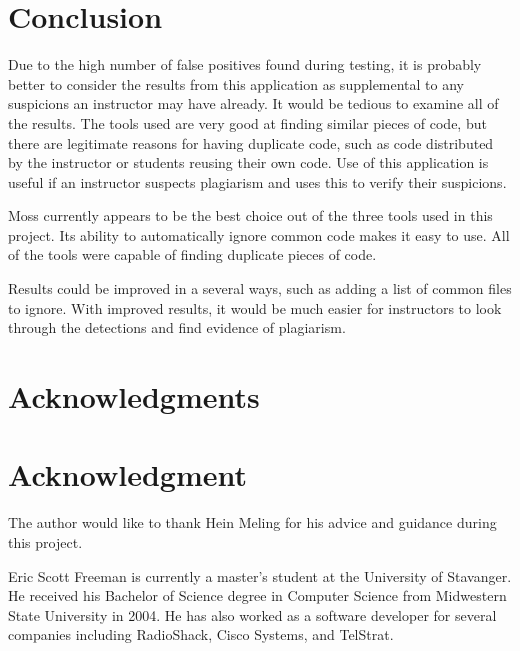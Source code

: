 \documentclass[10pt,journal,compsoc]{IEEEtran}
\begin{document}
	\section{Conclusion}
	Due to the high number of false positives found during testing, it is probably better to consider the results from this application as supplemental to any suspicions an instructor may have already. It would be tedious to examine all of the results. The tools used are very good at finding similar pieces of code, but there are legitimate reasons for having duplicate code, such as code distributed by the instructor or students reusing their own code. Use of this application is useful if an instructor suspects plagiarism and uses this to verify their suspicions.
	
	Moss currently appears to be the best choice out of the three tools used in this project. Its ability to automatically ignore common code makes it easy to use. All of the tools were capable of finding duplicate pieces of code.
	
	Results could be improved in a several ways, such as adding a list of common files to ignore. With improved results, it would be much easier for instructors to look through the detections and find evidence of plagiarism.
	
	\ifCLASSOPTIONcompsoc
		\section*{Acknowledgments}
	\else
		\section*{Acknowledgment}
	\fi
	
	The author would like to thank Hein Meling for his advice and guidance during this project.
	
	
	

\begin{IEEEbiographynophoto}{Eric Scott Freeman}
is currently a master's student at the University of Stavanger. He received his Bachelor of Science degree in Computer Science from Midwestern State University in 2004. He has also worked as a software developer for several companies including RadioShack, Cisco Systems, and TelStrat.
\end{IEEEbiographynophoto}
\end{document}
